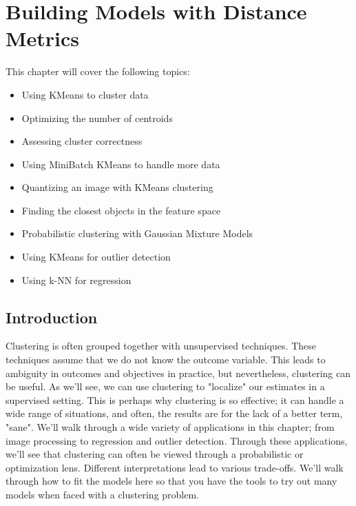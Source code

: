 \documentclass[SKL-MASTER.tex]{subfiles}
\begin{document}
	\Large
\section*{Building Models with Distance Metrics}

This chapter will cover the following topics:
\begin{itemize}
\item Using KMeans to cluster data
\item Optimizing the number of centroids
\item Assessing cluster correctness
\item Using MiniBatch KMeans to handle more data
\item Quantizing an image with KMeans clustering
\item Finding the closest objects in the feature space
\item Probabilistic clustering with Gaussian Mixture Models
\item Using KMeans for outlier detection
\item Using k-NN for regression
\end{itemize}
\newpage
\subsection*{Introduction}
Clustering is often grouped together with unsupervised
techniques. These techniques assume that we do not know the outcome variable. This leads
to ambiguity in outcomes and objectives in practice, but nevertheless, clustering can be useful.
As we'll see, we can use clustering to "localize" our estimates in a supervised setting. This is
perhaps why clustering is so effective; it can handle a wide range of situations, and often,
the results are for the lack of a better term, "sane".
We'll walk through a wide variety of applications in this chapter; from image processing to
regression and outlier detection. Through these applications, we'll see that clustering can
often be viewed through a probabilistic or optimization lens. Different interpretations lead
to various trade-offs. We'll walk through how to fit the models here so that you have the
tools to try out many models when faced with a clustering problem.
\end{document}
